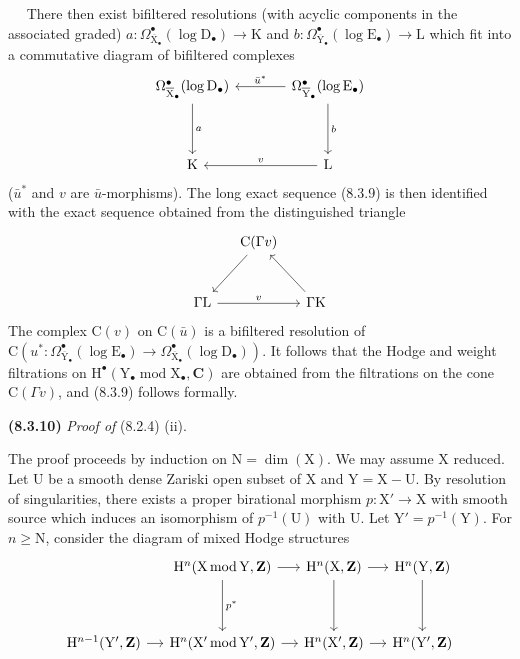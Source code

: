 \documentclass[11pt,leqno]{article}
\newcommand{\Page}[1]{\ifvmode\noindent\else\unskip\ \fi{\footnotesize\textcolor{gray}{[p.\,#1]}}\ \ignorespaces}
\begin{document}
\Page{44}
There then exist bifiltered resolutions (with acyclic components in the associated graded) \(a:\Omega_{\overline{\mathrm{X}}_\bullet}^\bullet(\log\mathrm{D}_\bullet)\to\mathrm{K}\) and \(b:\Omega_{\overline{\mathrm{Y}}_\bullet}^\bullet(\log\mathrm{E}_\bullet)\to\mathrm{L}\) which fit into a commutative diagram of bifiltered complexes
\[
\begin{tikzcd}[column sep=large,row sep=huge]
\Omega_{\overline{\mathrm{X}}_\bullet}^\bullet(\log\mathrm{D}_\bullet)
  \arrow[d,"a"]
 & \Omega_{\overline{\mathrm{Y}}_\bullet}^\bullet(\log\mathrm{E}_\bullet)
   \arrow[l,"\bar{u}^*"'] \arrow[d,"b"]\\
\mathrm{K}
 & \mathrm{L} \arrow[l,"v"']
\end{tikzcd}
\]
(\(\bar{u}^*\) and \(v\) are \(\bar{u}\)-morphisms). The long exact sequence (8.3.9) is then identified with the exact sequence obtained from the distinguished triangle
\[
\begin{tikzcd}[column sep=small,row sep=large]
 & \mathrm{C}(\Gamma v) \arrow[dl] &\\
\Gamma\mathrm{L} \arrow[rr,"v"]
 & & \Gamma\mathrm{K} \arrow[ul]
\end{tikzcd}
\]
The complex \(\mathrm{C}(v)\) on \(\mathrm{C}(\bar{u})\) is a bifiltered resolution of \(\mathrm{C}(u^*:\Omega_{\overline{\mathrm{Y}}_\bullet}^\bullet(\log\mathrm{E}_\bullet)\to\Omega_{\overline{\mathrm{X}}_\bullet}^\bullet(\log\mathrm{D}_\bullet))\). It follows that the Hodge and weight filtrations on \(\mathrm{H}^\bullet(\mathrm{Y}_\bullet\operatorname{mod}\mathrm{X}_\bullet,\mathbf{C})\) are obtained from the filtrations on the cone \(\mathrm{C}(\Gamma v)\), and (8.3.9) follows formally.

\textbf{(8.3.10)} \textit{Proof of} (8.2.4) (ii).

The proof proceeds by induction on \(\mathrm{N}=\dim(\mathrm{X})\). We may assume \(\mathrm{X}\) reduced. Let \(\mathrm{U}\) be a smooth dense Zariski open subset of \(\mathrm{X}\) and \(\mathrm{Y}=\mathrm{X}-\mathrm{U}\). By resolution of singularities, there exists a proper birational morphism \(p:\mathrm{X}'\to\mathrm{X}\) with smooth source which induces an isomorphism of \(p^{-1}(\mathrm{U})\) with \(\mathrm{U}\). Let \(\mathrm{Y}'=p^{-1}(\mathrm{Y})\). For \(n\geq\mathrm{N}\), consider the diagram of mixed Hodge structures
\[
\begin{tikzcd}[column sep=small,row sep=huge]
 & \mathrm{H}^n(\mathrm{X}\operatorname{mod}\mathrm{Y},\mathbf{Z})
   \arrow[r] \arrow[d,"p^*"]
 & \mathrm{H}^n(\mathrm{X},\mathbf{Z}) \arrow[r] \arrow[d]
 & \mathrm{H}^n(\mathrm{Y},\mathbf{Z}) \arrow[d]\\
\mathrm{H}^{n-1}(\mathrm{Y}',\mathbf{Z}) \arrow[r]
 & \mathrm{H}^n(\mathrm{X}'\operatorname{mod}\mathrm{Y}',\mathbf{Z})
   \arrow[r]
 & \mathrm{H}^n(\mathrm{X}',\mathbf{Z}) \arrow[r]
 & \mathrm{H}^n(\mathrm{Y}',\mathbf{Z})
\end{tikzcd}
\]
\end{document}

